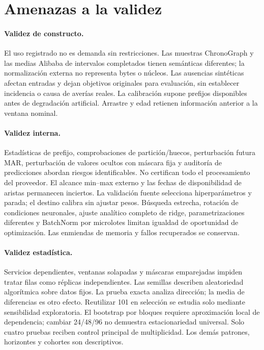 \section{Amenazas a la validez}
\paragraph{Validez de constructo.} El uso registrado no es demanda sin restricciones. Las muestras ChronoGraph y las medias Alibaba de intervalos completados tienen semánticas diferentes; la normalización externa no representa bytes o núcleos. Las ausencias sintéticas afectan entradas y dejan objetivos originales para evaluación, sin establecer incidencia o causa de averías reales. La calibración supone prefijos disponibles antes de degradación artificial. Arrastre y edad retienen información anterior a la ventana nominal.

\paragraph{Validez interna.} Estadísticas de prefijo, comprobaciones de partición/huecos, perturbación futura MAR, perturbación de valores ocultos con máscara fija y auditoría de predicciones abordan riesgos identificables. No certifican todo el procesamiento del proveedor. El alcance min--max externo y las fechas de disponibilidad de aristas permanecen inciertos. La validación fuente selecciona hiperparámetros y parada; el destino calibra sin ajustar pesos. Búsqueda estrecha, rotación de condiciones neuronales, ajuste analítico completo de ridge, parametrizaciones diferentes y BatchNorm por microlotes limitan igualdad de oportunidad de optimización. Las enmiendas de memoria y fallos recuperados se conservan.

\paragraph{Validez estadística.} Servicios dependientes, ventanas solapadas y máscaras emparejadas impiden tratar filas como réplicas independientes. Las semillas describen aleatoriedad algorítmica sobre datos fijos. La prueba exacta analiza dirección; la media de diferencias es otro efecto. Reutilizar 101 en selección se estudia solo mediante sensibilidad exploratoria. El bootstrap por bloques requiere aproximación local de dependencia; cambiar 24/48/96 no demuestra estacionariedad universal. Solo cuatro pruebas reciben control principal de multiplicidad. Los demás patrones, horizontes y cohortes son descriptivos.

